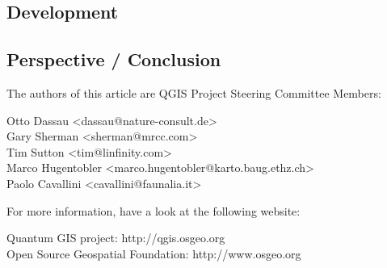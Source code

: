 \subsection{Development}

\subsection{Perspective / Conclusion}


The authors of this article are QGIS Project Steering Committee Members:

Otto Dassau <dassau@nature-consult.de>  
\\Gary Sherman <sherman@mrcc.com>
\\Tim Sutton <tim@linfinity.com>
\\Marco Hugentobler <marco.hugentobler@karto.baug.ethz.ch>
\\Paolo Cavallini <cavallini@faunalia.it>


For more information, have a look at the following website:

Quantum GIS project: http://qgis.osgeo.org
\\Open Source Geospatial Foundation: http://www.osgeo.org
 


 



